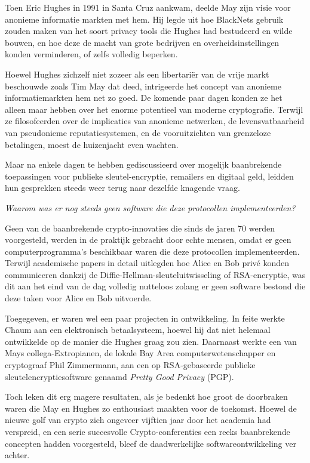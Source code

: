 \documentclass[
  a5paper,
  smalldemyvopaper,11pt,twoside,onecolumn,openright,extrafontsizes,
hidelinks]{memoir}
\begin{document}
Toen Eric Hughes in 1991 in Santa Cruz aankwam, deelde May zijn visie
voor anonieme informatie markten met hem. Hij legde uit hoe BlackNets
gebruik zouden maken van het soort privacy tools die Hughes had
bestudeerd en wilde bouwen, en hoe deze de macht van grote bedrijven en
overheidsinstellingen konden verminderen, of zelfs volledig beperken.

Hoewel Hughes zichzelf niet zozeer als een libertariër van de vrije
markt beschouwde zoals Tim May dat deed, intrigeerde het concept van
anonieme informatiemarkten hem net zo goed. De komende paar dagen konden
ze het alleen maar hebben over het enorme potentieel van moderne
cryptografie. Terwijl ze filosofeerden over de implicaties van anonieme
netwerken, de levensvatbaarheid van pseudonieme reputatiesystemen, en de
vooruitzichten van grenzeloze betalingen, moest de huizenjacht even
wachten.

Maar na enkele dagen te hebben gediscussieerd over mogelijk baanbrekende
toepassingen voor publieke sleutel-encryptie, remailers en digitaal
geld, leidden hun gesprekken steeds weer terug naar dezelfde knagende
vraag.

\emph{Waarom was er nog steeds geen software die deze protocollen
implementeerden?}

Geen van de baanbrekende crypto-innovaties die sinds de jaren 70 werden
voorgesteld, werden in de praktijk gebracht door echte mensen, omdat er
geen computerprogramma's beschikbaar waren die deze protocollen
implementeerden. Terwijl academische papers in detail uitlegden hoe
Alice en Bob privé konden communiceren dankzij de
Diffie-Hellman-sleuteluitwisseling of RSA-encryptie, was dit aan het
eind van de dag volledig nutteloos zolang er geen software bestond die
deze taken voor Alice en Bob uitvoerde.

Toegegeven, er waren wel een paar projecten in ontwikkeling. In feite
werkte Chaum aan een elektronisch betaalsysteem, hoewel hij dat niet
helemaal ontwikkelde op de manier die Hughes graag zou zien. Daarnaast
werkte een van Mays collega-Extropianen, de lokale Bay Area
computerwetenschapper en cryptograaf Phil Zimmermann, aan een op
RSA-gebaseerde publieke sleutelencryptiesoftware genaamd \emph{Pretty
Good Privacy} (PGP).

Toch leken dit erg magere resultaten, als je bedenkt hoe groot de
doorbraken waren die May en Hughes zo enthousiast maakten voor de
toekomst. Hoewel de nieuwe golf van crypto zich ongeveer vijftien jaar
door het academia had verspreid, en een serie succesvolle
Crypto-conferenties een reeks baanbrekende concepten hadden voorgesteld,
bleef de daadwerkelijke softwareontwikkeling ver achter.
\end{document}
